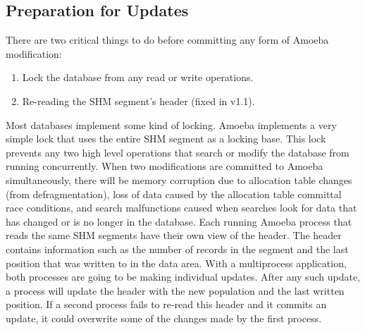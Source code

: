 \documentclass[11pt]{article}
\begin{document}
\subsection{Preparation for Updates}
There are two critical things to do before committing any form of Amoeba modification:
\begin{enumerate}
\item Lock the database from any read or write operations.
\item Re-reading the SHM segment's header (fixed in v1.1).
\end{enumerate}
Most databases implement some kind of locking. Amoeba implements a very simple lock that uses the entire SHM segment as a locking base. This lock prevents any two high level operations that search or modify the database from running concurrently. When two modifications are committed to Amoeba simultaneously, there will be memory corruption due to allocation table changes (from defragmentation), loss of data caused by the allocation table committal race conditions, and search malfunctions caused when searches look for data that has changed or is no longer in the database.
\newline
\newline
Each running Amoeba process that reads the same SHM segments have their own view of the header. The header contains information such as the number of records in the segment and the last position that was written to in the data area. With a multiprocess application, both processes are going to be making individual updates. After any such update, a process will update the header with the new population and the last written position. If a second process fails to re-read this header and it commits an update, it could overwrite some of the changes made by the first process. 
\end{document}
